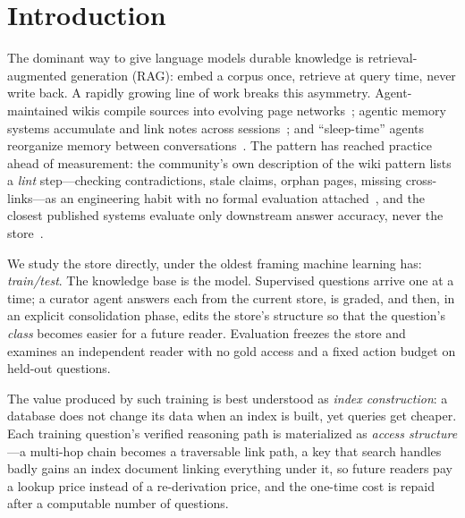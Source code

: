 \documentclass[conference]{IEEEtran}
\begin{document}
\section{Introduction}
The dominant way to give language models durable knowledge is retrieval-augmented
generation (RAG): embed a corpus once, retrieve at query time, never write back. A
rapidly growing line of work breaks this asymmetry. Agent-maintained wikis compile
sources into evolving page networks~\cite{llmwiki-rar,llmwiki-stream,karpathy-llmwiki};
agentic memory systems accumulate and link notes across sessions~\cite{amem}; and
``sleep-time'' agents reorganize memory between conversations~\cite{letta-sleep}. The
pattern has reached practice ahead of measurement: the community's own description of
the wiki pattern lists a \emph{lint} step---checking contradictions, stale claims,
orphan pages, missing cross-links---as an engineering habit with no formal evaluation
attached~\cite{karpathy-llmwiki}, and the closest published systems evaluate only
downstream answer accuracy, never the store~\cite{llmwiki-rar,llmwiki-stream}.

We study the store directly, under the oldest framing machine learning has:
\emph{train/test}. The knowledge base is the model. Supervised questions arrive one at
a time; a curator agent answers each from the current store, is graded, and then, in
an explicit consolidation phase, edits the store's structure so that the question's
\emph{class} becomes easier for a future reader. Evaluation freezes the store and
examines an independent reader with no gold access and a fixed action budget on
held-out questions.

The value produced by such training is best understood as \emph{index construction}:
a database does not change its data when an index is built, yet queries get cheaper.
Each training question's verified reasoning path is materialized as
\emph{access structure}---a multi-hop chain becomes a traversable link
path, a key that search handles badly gains an index document linking
everything under it, so future readers pay a lookup price instead of a
re-derivation price, and the one-time cost is repaid after a computable
number of questions.
\end{document}
